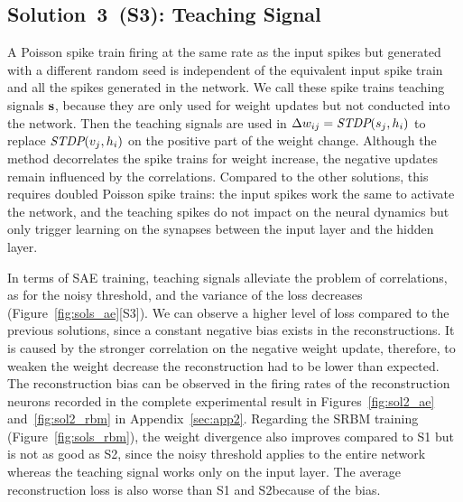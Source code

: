 \subsection{Solution~3~(S3): Teaching Signal}
A Poisson spike train firing at the same rate as the input spikes but generated with a different random seed is independent of the equivalent input spike train and all the spikes generated in the network.
We call these spike trains teaching signals $\bf{s}$, because they are only used for weight updates but not conducted into the network.
Then the teaching signals are used in $\Delta w_{ij} = \textit{\textrm{STDP}}(s_j,h_i)$ to replace $\textit{\textrm{STDP}}(v_j,h_i)$ on the positive part of the weight change.
Although the method decorrelates the spike trains for weight increase, the negative updates remain influenced by the correlations.  
Compared to the other solutions, this requires doubled Poisson spike trains: the input spikes work the same to activate the network, and the teaching spikes do not impact on the neural dynamics but only trigger learning on the synapses between the input layer and the hidden layer.

In terms of SAE training, teaching signals alleviate the problem of correlations, as for the noisy threshold, and the variance of the loss decreases (Figure~\ref{fig:sols_ae}[S3]).
We can observe a higher level of loss compared to the previous solutions, since a constant negative bias exists in the reconstructions.
It is caused by the stronger correlation on the negative weight update, therefore, to weaken the weight decrease the reconstruction had to be lower than expected.  
The reconstruction bias can be observed in the firing rates of the reconstruction neurons recorded in the complete experimental result in Figures~\ref{fig:sol2_ae} and~\ref{fig:sol2_rbm} in Appendix~\ref{sec:app2}.
Regarding the SRBM training (Figure~\ref{fig:sols_rbm}), the weight divergence also improves compared to S1 but is not as good as S2, since the noisy threshold applies to the entire network whereas the teaching signal works only on the input layer.
The average reconstruction loss is also worse than S1 and S2\DIFaddbegin {}\DIFaddend because of the bias. 

